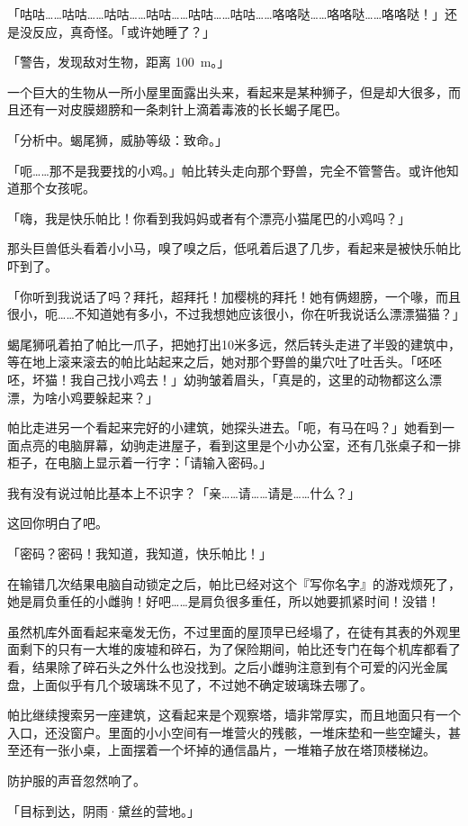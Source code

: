 「咕咕……咕咕……咕咕……咕咕……咕咕……咕咕……咯咯哒……咯咯哒……咯咯哒！」还是没反应，真奇怪。「或许她睡了？」

「{\mt 警告，发现敌对生物，距离 \SI{100}{m}。}」

一个巨大的生物从一所小屋里面露出头来，看起来是某种狮子，但是却大很多，而且还有一对皮膜翅膀和一条刺针上滴着毒液的长长蝎子尾巴。

「{\mt 分析中。蝎尾狮，威胁等级：致命。}」

「呃……那不是我要找的小鸡。」帕比转头走向那个野兽，完全不管警告。或许他知道那个女孩呢。

「嗨，我是快乐帕比！你看到我妈妈或者有个漂亮小猫尾巴的小鸡吗？」

那头巨兽低头看着小小马，嗅了嗅之后，低吼着后退了几步，看起来是被快乐帕比吓到了。

「你听到我说话了吗？拜托，超拜托！加樱桃的拜托！她有俩翅膀，一个喙，而且很小，呃……不知道她有多小，不过我想她应该很小，你在听我说话么漂漂猫猫？」

蝎尾狮吼着拍了帕比一爪子，把她打出10米多远，然后转头走进了半毁的建筑中，等在地上滚来滚去的帕比站起来之后，她对那个野兽的巢穴吐了吐舌头。「呸呸呸，坏猫！我自己找小鸡去！」幼驹皱着眉头，「真是的，这里的动物都这么漂漂，为啥小鸡要躲起来？」

帕比走进另一个看起来完好的小建筑，她探头进去。「呃，有马在吗？」她看到一面点亮的电脑屏幕，幼驹走进屋子，看到这里是个小办公室，还有几张桌子和一排柜子，在电脑上显示着一行字：「{\mt 请输入密码。}」

我有没有说过帕比基本上不识字？「亲……请……请是……什么？」

这回你明白了吧。

「密码？密码！我知道，我知道，快乐帕比！」

在输错几次结果电脑自动锁定之后，帕比已经对这个『写你名字』的游戏烦死了，她是肩负重任的小雌驹！好吧……是肩负很多重任，所以她要抓紧时间！没错！

虽然机库外面看起来毫发无伤，不过里面的屋顶早已经塌了，在徒有其表的外观里面剩下的只有一大堆的废墟和碎石，为了保险期间，帕比还专门在每个机库都看了看，结果除了碎石头之外什么也没找到。之后小雌驹注意到有个可爱的闪光金属盘，上面似乎有几个玻璃珠不见了，不过她不确定玻璃珠去哪了。

帕比继续搜索另一座建筑，这看起来是个观察塔，墙非常厚实，而且地面只有一个入口，还没窗户。里面的小小空间有一堆营火的残骸，一堆床垫和一些空罐头，甚至还有一张小桌，上面摆着一个坏掉的通信晶片，一堆箱子放在塔顶楼梯边。

防护服的声音忽然响了。

「目标到达，阴雨·黛丝的营地。」

